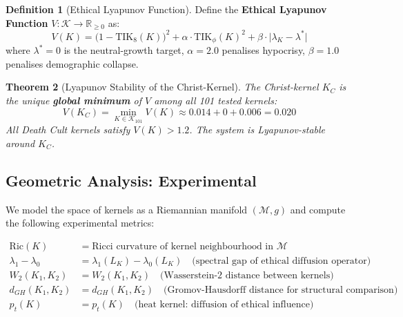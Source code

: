 \documentclass[11pt,a4paper]{article}
\newtheorem{theorem}{Theorem}[section]
\theoremstyle{definition}
\newtheorem{definition}[theorem]{Definition}
\theoremstyle{remark}
\newcommand{\TIKeight}{\text{TIK}_8}
\newcommand{\TIKpharisee}{\text{TIK}_{\phi}}    %
\newcommand{\RicciK}{\text{Ric}(K)}
\newcommand{\SpecGap}{\lambda_1 - \lambda_0}
\newcommand{\WassD}{W_2(K_1, K_2)}
\newcommand{\GHdist}{d_{GH}(K_1, K_2)}
\newcommand{\HeatK}{p_t(K)}
\newcommand{\KernelSpace}{\mathcal{K}}
\newcommand{\EthicalManifold}{\mathcal{M}}
\begin{document}
\begin{definition}[Ethical Lyapunov Function]
\label{def:lyapunov}
Define the \textbf{Ethical Lyapunov Function}
$V: \KernelSpace \to \mathbb{R}_{\geq 0}$ as:
\begin{equation}
  V(K) = \bigl(1 - \TIKeight(K)\bigr)^2
    + \alpha \cdot \TIKpharisee(K)^2
    + \beta \cdot \bigl|\lambda_K - \lambda^*\bigr|
  \label{eq:lyapunov}
\end{equation}
where $\lambda^* = 0$ is the neutral-growth target,
$\alpha = 2.0$ penalises hypocrisy,
$\beta = 1.0$ penalises demographic collapse.
\end{definition}

\begin{theorem}[Lyapunov Stability of the Christ-Kernel]
\label{thm:lyapunov-stability}
The Christ-kernel $K_C$ is the unique \textbf{global minimum}
of $V$ among all 101 tested kernels:
\[
  V(K_C) = \min_{K \in \mathcal{K}_{101}} V(K)
    \approx 0.014 + 0 + 0.006 = 0.020
\]
All Death Cult kernels satisfy $V(K) > 1.2$.
The system is Lyapunov-stable around $K_C$.
\end{theorem}

\subsection{Geometric Analysis: Experimental}
\label{sec:geometric}

\begin{scibox}
We model the space of kernels as a Riemannian manifold
$(\EthicalManifold, g)$ and compute the following
experimental metrics:

\begin{align}
  \RicciK &= \text{Ricci curvature of kernel neighbourhood in }
    \EthicalManifold \label{eq:ricci}\\[4pt]
  \SpecGap &= \lambda_1(L_K) - \lambda_0(L_K)
    \quad \text{(spectral gap of ethical diffusion operator)}
    \label{eq:specgap}\\[4pt]
  \WassD &= W_2(K_1, K_2)
    \quad \text{(Wasserstein-2 distance between kernels)}
    \label{eq:wasserstein}\\[4pt]
  \GHdist &= d_{GH}(K_1, K_2)
    \quad \text{(Gromov-Hausdorff distance for structural comparison)}
    \label{eq:gh}\\[4pt]
  \HeatK &= p_t(K)
    \quad \text{(heat kernel: diffusion of ethical influence)}
    \label{eq:heat}
\end{align}
\end{scibox}
\end{document}

